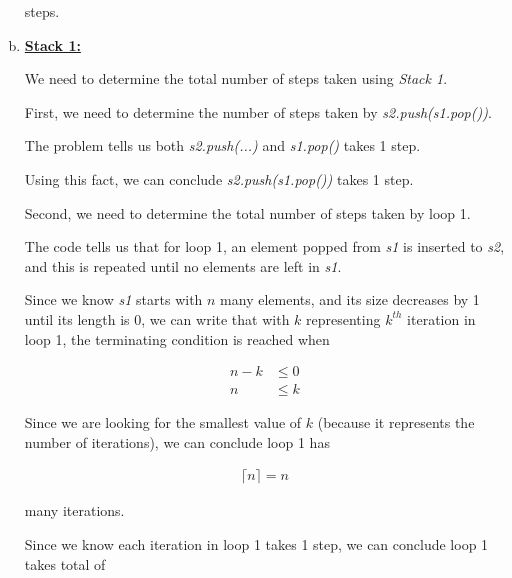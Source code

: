 \documentclass[12pt]{article}
\begin{document}
\begin{enumerate}[a.]
\begin{mdframed}
        steps.

    \end{mdframed}

    \item

    \underline{\textbf{Stack 1:}}

    \bigskip

    We need to determine the total number of steps taken using \textit{Stack 1}.

    \bigskip

    First, we need to determine the number of steps taken by \textit{s2.push(s1.pop())}.

    \bigskip

    The problem tells us both \textit{s2.push(...)} and \textit{s1.pop()} takes 1 step.

    \bigskip

    Using this fact, we can conclude \textit{s2.push(s1.pop())} takes 1 step.

    \bigskip

    Second, we need to determine the total number of steps taken by loop 1.

    \bigskip

    The code tells us that for loop 1, an element popped from \textit{s1} is inserted to \textit{s2},
    and this is repeated until no elements are left in \textit{s1}.

    \bigskip

    Since we know \textit{s1} starts with $n$ many elements, and its size decreases
    by 1 until its length is 0, we can write that with $k$ representing
    $k^{th}$ iteration in loop 1, the terminating condition is reached when

    \setcounter{equation}{0}
    \begin{align}
        n - k &\leq 0\\
        n &\leq k
    \end{align}

    \bigskip

    Since we are looking for the smallest value of $k$ (because it represents
    the number of iterations), we can conclude loop 1 has

    \begin{align}
        \lceil n \rceil = n
    \end{align}

    many iterations.

    \bigskip

    Since we know each iteration in loop 1 takes 1 step, we can conclude
    loop 1 takes total of


\end{enumerate}
\end{document}
